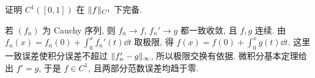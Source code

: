 \begin{exercise}\label{legacy:ch02:exercise2}
证明 $C^1([0,1])$ 在 $\lVert f\rVert_{C^1}$ 下完备.
\end{exercise}
\begin{solution}
若 $(f_n)$ 为 Cauchy 序列, 则 $f_n\to f$, $f_n'\to g$ 都一致收敛, 且 $f,g$ 连续. 由 $f_n(x)=f_n(0)+\int_0^xf_n'(t)\dd t$ 取极限, 得 $f(x)=f(0)+\int_0^xg(t)\dd t$. 这里一致误差使积分误差不超过 $\lVert f_n'-g\rVert_\infty$, 所以极限交换有依据. 微积分基本定理给出 $f'=g$, 于是 $f\in C^1$, 且两部分范数误差均趋于零.
\end{solution}
